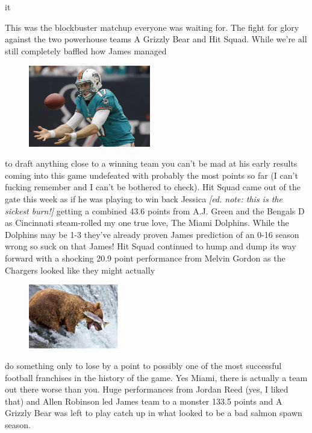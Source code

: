 \documentclass[11pt,letterpaper]{article}
\begin{document}
 it
\newpage
{}
\par\noindent This was the blockbuster matchup everyone was waiting for. The fight for glory against the two powerhouse teams A Grizzly Bear and Hit Squad. While we're all still completely baffled how James managed 
\begin{figure}
\centering
\includegraphics[width=0.475\textwidth]{week4-tannehill.png}
\label{fig:week4-tannehill}
\end{figure} 
\par\noindent to draft anything close to a winning team you can't be mad at his early results coming into this game undefeated with probably the most points so far (I can't fucking remember and I can't be bothered to check). Hit Squad came out of the gate this week as if he was playing to win back Jessica \textit{[ed. note: this is the sickest burn!]} getting a combined 43.6 points from A.J. Green and the Bengals D as Cincinnati steam-rolled my one true love, The Miami Dolphins. While the Dolphins may be 1-3 they've already proven James prediction of an 0-16 season wrong so suck on that James! Hit Squad continued to hump and dump its way forward with a shocking 20.9 point performance from Melvin Gordon as the Chargers looked like they might actually 
\begin{figure}
\centering
\includegraphics[width=0.35\textwidth]{week4-bear.png}
\label{fig:week4-bear}
\end{figure} 
\par\noindent do something only to lose by a point to possibly one of the most successful football franchises in the history of the game. Yes Miami, there is actually a team out there worse than you. Huge performances from Jordan Reed (yes, I liked that) and Allen Robinson led James team to a monster 133.5 points and A Grizzly Bear was left to play catch up in what looked to be a bad salmon spawn season. 
\end{document}
